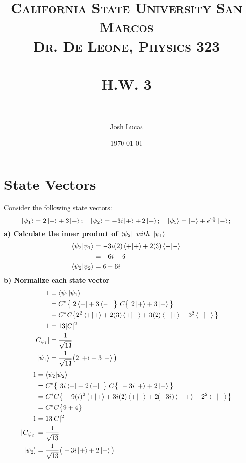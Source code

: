 \documentclass[paper=a4, fontsize=11pt]{scrartcl} %
\title{	
\normalfont \normalsize 
\textsc{California State University San Marcos \\ Dr. De Leone, Physics 323} \\ [25pt] %
\horrule{0.5pt} \\[0.4cm] %
\huge H.W. 3 \\ %
\horrule{2pt} \\[0.5cm] %
}
\author{Josh Lucas} %
\date{\normalsize\today} %
\numberwithin{equation}{section} %
\numberwithin{figure}{section} %
\numberwithin{table}{section} %
\begin{document}
\maketitle %


\section{State Vectors}
Consider the following state vectors:
\begin{equation*}
\ket{\psi_1} = 2\ket{+} + 3\ket{-};\quad \ket{\psi_2} = -3i\ket{+} + 2\ket{-};\quad \ket{\psi_3} = \ket{+} + e^{i\frac{ \pi}{4}}\ket{-};  
\end{equation*}
\textbf{a) Calculate the inner product of $\bra{\psi_2}\ with\ \ket{\psi_1}$}\\
\begin{align*}
\braket{\psi_2 |\psi_1} & = -3i(2) \braket{+|+} +2(3)\braket{-|-}\\
   & =  -6i + 6\\
   \braket{\psi_2 | \psi_2} &= 6-6i
\end{align*}
\textbf{b) Normalize each state vector}\\
 \begin{align*}
1 & = \braket{\psi_1 | \psi_1} \\
 & = C^* \big \{\ 2\bra{+} +3\bra{-}\ \big\}\ C\big \{\ 2\ket{+}+3\ket{-} \big \} \\
& = C^*C \big \{ 2^2 \braket{+|+} + 2(3)\braket{+|-} + 3(2)\braket{-|+} + 3^2 \braket{-|-} \big \}  \\
 1 & = 13|C|^2 \\
 |C_{\psi_1}| & = \frac{1}{\sqrt{13}} \\
 \ket{\psi_1} & = \frac{1}{\sqrt{13}} \big ( 2\ket{+} + 3\ket{-} \big )
\end{align*}
 \begin{align*}
1 & = \braket{\psi_2 | \psi_2} \\
 & = C^* \big \{\ 3i\bra{+} +2\bra{-}\ \big\}\ C\big \{\ -3i\ket{+}+2\ket{-} \big \} \\
& = C^*C \big \{ -9(i)^2 \braket{+|+} +3i(2)\braket{+|-} + 2(-3i)\braket{-|+} + 2^2 \braket{-|-} \big \}  \\
& = C^*C \big \{ 9 + 4 \big \} \\  
 1 & = 13|C|^2 \\
 |C_{\psi_2}| & = \frac{1}{\sqrt{13}} \\
 \ket{\psi_2} & = \frac{1}{\sqrt{13}} \big ( -3i\ket{+} + 2\ket{-} \big )
\end{align*}
\end{document}
